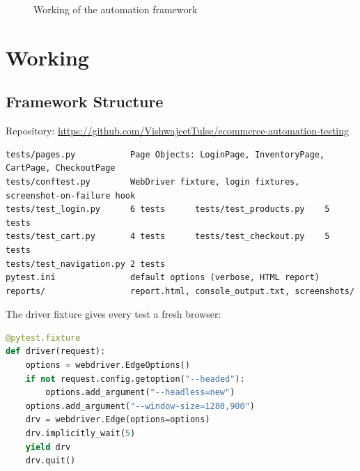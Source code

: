 \documentclass[12pt,a4paper]{article}
\begin{document}
\begin{figure}[H]
\centering
{}
\caption{Working of the automation framework}
\end{figure}

\section{Working}\label{sec:work}
\subsection{Framework Structure}\label{sec:work1}
Repository: \url{https://github.com/VishwajeetTulse/ecommerce-automation-testing}
\begin{lstlisting}
tests/pages.py           Page Objects: LoginPage, InventoryPage, CartPage, CheckoutPage
tests/conftest.py        WebDriver fixture, login fixtures, screenshot-on-failure hook
tests/test_login.py      6 tests      tests/test_products.py    5 tests
tests/test_cart.py       4 tests      tests/test_checkout.py    5 tests
tests/test_navigation.py 2 tests
pytest.ini               default options (verbose, HTML report)
reports/                 report.html, console_output.txt, screenshots/
\end{lstlisting}

The driver fixture gives every test a fresh browser:
\begin{lstlisting}[language=Python]
@pytest.fixture
def driver(request):
    options = webdriver.EdgeOptions()
    if not request.config.getoption("--headed"):
        options.add_argument("--headless=new")
    options.add_argument("--window-size=1280,900")
    drv = webdriver.Edge(options=options)
    drv.implicitly_wait(5)
    yield drv
    drv.quit()
\end{lstlisting}
\end{document}
